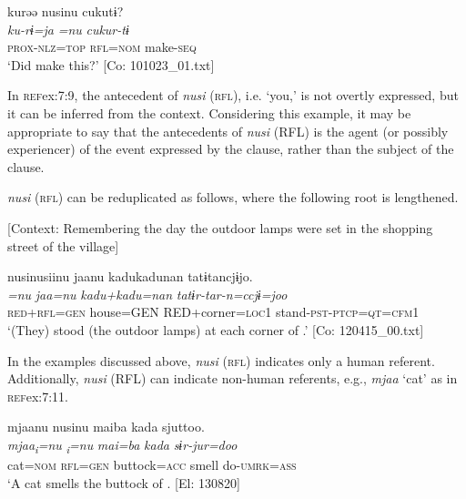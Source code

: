 {\MY}
\glll  kurəə  nusinu  cukutɨ?\\
    \textit{ku-rɨ=ja}  \textit{=nu}  \textit{cukur-tɨ}\\
    \textsc{prox}-\textsc{nlz}=\textsc{top}  \textsc{rfl}=\textsc{nom}  make-\textsc{seq}\\
    \glt [lit.] ‘Did  make this?’ [Co: 101023\_01.txt]

\z

In \textsc{ref}{ex:7:9}, the antecedent of \textit{nusi} (\textsc{rfl}), i.e. ‘you,’ is not overtly expressed, but it can be inferred from the context. Considering this example, it may be appropriate to say that the antecedents of \textit{nusi} (RFL) is the agent (or possibly experiencer) of the event expressed by the clause, rather than the subject of the clause.

\textit{nusi} (\textsc{rfl}) can be reduplicated as follows, where the following root is lengthened.

\ea \label{ex:7:10}  [Context: Remembering the day the outdoor lamps were set in the shopping street of the village]

{\TM}
\glll  nusinusiinu  jaanu  kadukadunan  tatɨtancjɨjo.\\
\textit{=nu}  \textit{jaa=nu}  \textit{kadu+kadu=nan}  \textit{tatɨr-tar-n=ccjɨ=joo}\\
\textsc{red}+\textsc{rfl}=\textsc{gen}  house=GEN  RED+corner=\textsc{loc}1  stand-\textsc{pst}-\textsc{ptcp}=\textsc{qt}=\textsc{cfm}1\\
\glt ‘(They) stood (the outdoor lamps) at each corner of .’ [Co: 120415\_00.txt]

\z

  In the examples discussed above, \textit{nusi} (\textsc{rfl}) indicates only a human referent. Additionally, \textit{nusi} (RFL) can indicate non-human referents, e.g., \textit{mjaa} ‘cat’ as in \textsc{ref}{ex:7:11}.

\ea \label{ex:7:11}{\TM}
\glll  mjaanu  nusinu  maiba  kada  sjuttoo.\\
\textit{mjaa\textsubscript{i}}\textit{=nu}  \textit{\textsubscript{i}}\textit{=nu}  \textit{mai=ba}  \textit{kada}  \textit{sɨr-jur=doo}\\
cat=\textsc{nom}  \textsc{rfl}=\textsc{gen}  buttock=\textsc{acc}  smell  do-\textsc{umrk}=\textsc{ass}\\
\glt ‘A cat smells the buttock of . [El: 130820]

